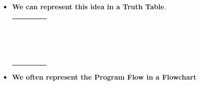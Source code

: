 \documentclass[11pt]{article}
\newcommand{\B}{\color{blue}}
\begin{document}
\begin{itemize}
\begin{itemize}
\begin{center}
\begin{tabular}{|| m{4cm} | m{5cm}| m{2.5cm} |m{3cm} || }
					\end{tabular}
					\end{center}


			
			\end{itemize}
				\newpage
	
				
					\item \textbf{We can represent this idea in a {\B Truth Table}}.\\
				
				\LARGE
					\begin{center}
					\begin{tabular}{|| m{2.75cm} | m{2.75cm}| m{2.75cm} |m{2.75cm}|m{2.75cm}|| } \hline
					 	 &  & &  &   \\
 						 &  & &  &   \\\hline\hline
 						 &  & &  &   \\
 						 &  & &  &   \\\hline
 						 &  & &  &   \\
 						 &  & &  &   \\\hline
 						 &  & &  &   \\
 						 &  & &  &   \\\hline
 						 &  & &  &   \\
 						 &  & &  &   \\\hline
 						 &  & &  &   \\
 						 &  & &  &   \\\hline
 						 &  & &  &   \\
 						 &  & &  &   \\\hline
 						 &  &  &  &   \\
 						 &  &  &  &   \\\hline
 						 &  &  &  &   \\
 						 &  &  &  &   \\\hline
 						   
					\end{tabular}
					\end{center}

				\newpage
	
				
					\item \textbf{We often represent the \color{mybrown} Program Flow \color{black} in a \color{mypurple} Flowchart\color{black} }\\
\end{itemize}


	
\end{document}
